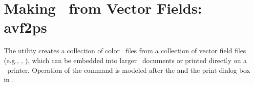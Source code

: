 
\section{Making \postscript\ from Vector Fields:
            avf2ps}\label{sec:avf2ps}%

The  utility creates a
collection of color \eps\ files from a collection of
vector field files (e.g., , ), which can be embedded
into larger \postscript\ documents or printed directly on a \postscript\
printer.  Operation of the  command is modeled after the
{} and the print
dialog box in {}.

